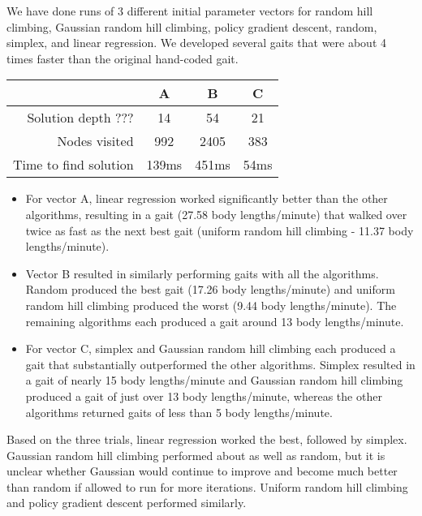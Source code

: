 We have done runs of 
3 different initial parameter vectors for random hill climbing, 
Gaussian random hill climbing, policy gradient descent, random,
simplex, and linear regression. We developed several
gaits that were about 4 times faster than the original hand-coded gait. 



\begin{tabular}{|r|c|c|c|}
\hline
                       & A     & B     & C    \\
\hline
Solution depth ???        & 14    & 54    & 21   \\
\hline
Nodes visited          & 992   & 2405  & 383  \\
\hline
Time to find solution  & 139ms & 451ms & 54ms \\
\hline
\end{tabular}



\begin{itemize}

\item For vector A, linear regression worked significantly better than the other algorithms, resulting in a gait (27.58 body lengths/minute) that walked over twice as fast as the next best gait (uniform random hill climbing - 11.37 body lengths/minute).

\item Vector B resulted in similarly performing gaits with all the algorithms. Random produced the best gait (17.26 body lengths/minute) and uniform random hill climbing produced the worst (9.44 body lengths/minute). The remaining algorithms each produced a gait around 13 body lengths/minute.

\item For vector C, simplex and Gaussian random hill climbing each produced a gait that substantially outperformed the other algorithms. Simplex resulted in a gait of nearly 15 body lengths/minute  and Gaussian random hill climbing produced a gait of just over 13 body lengths/minute, whereas the other algorithms returned gaits of less than 5 body lengths/minute.

\end{itemize}

Based on the three trials, linear regression worked the best, followed by simplex. Gaussian random hill climbing performed about as well as random, but it is unclear whether Gaussian would continue to improve and become much better than random if allowed to run for more iterations. Uniform random hill climbing and policy gradient descent performed similarly.

